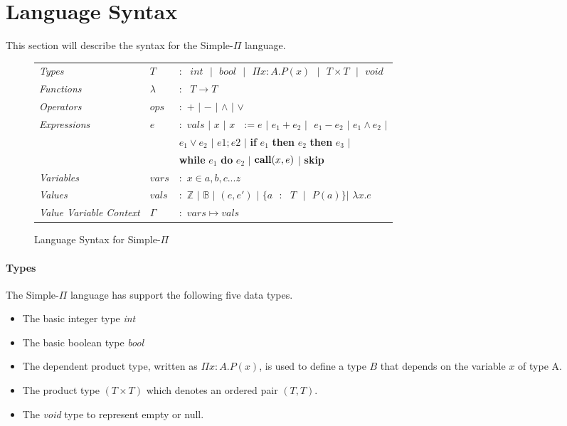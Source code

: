 \documentclass[a4paper,12pt]{report}
\begin{document}
\section{Language Syntax}
This section will describe the syntax for the Simple-$\Pi$ language. 

\begin{figure}[H]
  \begin{center}
    \begin{tabular}{l l l}
      \textit{Types} & $T$ & $:\text{ }int\text{ }|\text{ }bool\text{ }|\text{ }\Pi x: A.P(x)
      \text{ }|\text{ }T \times T\text{ }|\text{ }void$\\
      \textit{Functions} & $\lambda$ & $:\text{ }T\longrightarrow T$\\
      \textit{Operators} & $ops$ & $:$ $+$ $|$ $-$ $|$ $\wedge$ $|$ $\vee$ \\
      \textit{Expressions} & $e$ & $:$ $vals$ $|$ $x$ $|$ $x\text{ }:= e$ $|$ 
      $e_1 + e_2$ $| \text{ }e_1 - e_2$ $|$ $e_1 \wedge e_2$ $|$ \\ 
      & & \; $e_1 \vee e_2$ $|$ $e1;e2$ $|$ \textbf{if} $e_1$ \textbf{then} $e_2$ \textbf{then} $e_3$ $|$\\
      & & \;  \textbf{while} $e_1$ \textbf{do} $e_2$ $|$ 
      $\text{\textbf{call}}(x, e)$ $|$ \textbf{skip}\\
      \textit{Variables} & $vars$& $:$ $x \in {a,b,c...z}$\\
      \textit{Values} & $vals$& $:$ $\mathbb{Z}$ $|$ $\mathbb{B}$ $|$ $(e, e')$ $|$ $\{a\text{ }:
      \text{ }T\text{ }|\text{ } P(a)\}$\text{ }$|$ $\lambda x.e$\\
      \textit{Value Variable Context} & $\Gamma$& $:$ $vars \mapsto vals$
    \end{tabular}
  \end{center}
  \caption{Language Syntax for Simple-$\Pi$}
\end{figure}

\paragraph{Types} The Simple-$\Pi$ language has support the following five data types. 
\begin{itemize}
  \item The basic integer type \textit{int}
  \item The basic boolean type \textit{bool}
  \item The dependent product type, written as $\Pi x: A.P(x)$, is used to 
  define a type $B$ that depends on the variable $x$ of type A.
  \item The product type $(T \times T)$ which denotes an ordered pair $(T, T)$.
  \item The \textit{void} type to represent empty or null.
\end{itemize}
\end{document}
